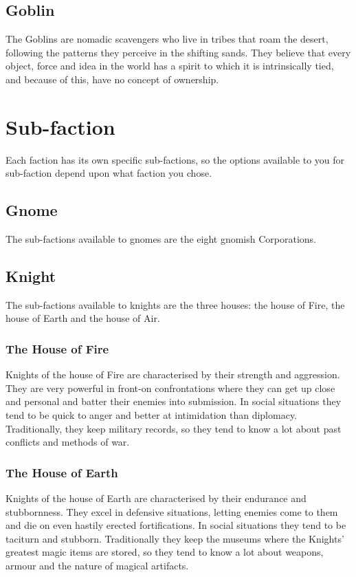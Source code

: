\documentclass{report}
\begin{document}
\subsection{Goblin}
The Goblins are nomadic scavengers who live in tribes that roam the desert, following the patterns they perceive in the
shifting sands. They believe that every object, force and idea in the world has a spirit to which it is intrinsically tied,
and because of this, have no concept of ownership.

\section{Sub-faction}
Each faction has its own specific sub-factions, so the options available to you for sub-faction depend upon what faction
you chose.

\subsection{Gnome}
The sub-factions available to gnomes are the eight gnomish Corporations.

\subsection{Knight}
The sub-factions available to knights are the three houses: the house of Fire, the house of Earth and the house of Air.

\subsubsection{The House of Fire}
Knights of the house of Fire are characterised by their strength and aggression. They are very powerful in front-on
confrontations where they can get up close and personal and batter their enemies into submission. In social situations they
tend to be quick to anger and better at intimidation than diplomacy. Traditionally, they keep military records, so they
tend to know a lot about past conflicts and methods of war.

\subsubsection{The House of Earth}
Knights of the house of Earth are characterised by their endurance and stubbornness. They excel in defensive situations,
letting enemies come to them and die on even hastily erected fortifications. In social situations they tend to be taciturn
and stubborn. Traditionally they keep the museums where the Knights' greatest magic items are stored, so they tend to know
a lot about weapons, armour and the nature of magical artifacts.
\end{document}

